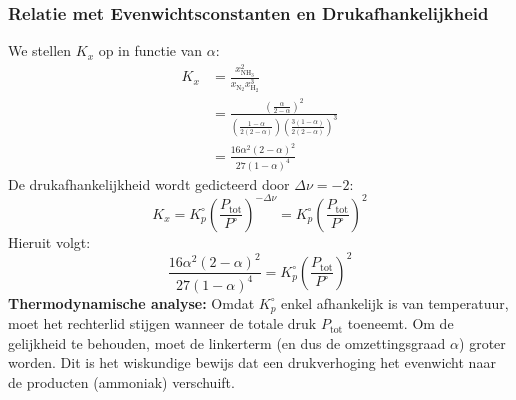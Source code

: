 \documentclass[11pt,a4paper]{article}
\begin{document}
\subsubsection{Relatie met Evenwichtsconstanten en Drukafhankelijkheid}
We stellen $K_x$ op in functie van $\alpha$:
\begin{align}
    K_x &= \frac{x_{\text{NH}_3}^2}{x_{\text{N}_2} x_{\text{H}_2}^3} \\
        &= \frac{\left( \frac{\alpha}{2-\alpha} \right)^2}{\left( \frac{1-\alpha}{2(2-\alpha)} \right) \left( \frac{3(1-\alpha)}{2(2-\alpha)} \right)^3} \\
        &= \frac{16 \alpha^2 (2-\alpha)^2}{27 (1-\alpha)^4}
\end{align}
De drukafhankelijkheid wordt gedicteerd door $\Delta \nu = -2$:
\begin{equation}
    K_x = K_p^\circ \left( \frac{P_{\text{tot}}}{P^\circ} \right)^{-\Delta \nu} = K_p^\circ \left( \frac{P_{\text{tot}}}{P^\circ} \right)^2
\end{equation}
Hieruit volgt:
\begin{equation}
    \frac{16 \alpha^2 (2-\alpha)^2}{27 (1-\alpha)^4} = K_p^\circ \left( \frac{P_{\text{tot}}}{P^\circ} \right)^2
\end{equation}
\textbf{Thermodynamische analyse:} 
Omdat $K_p^\circ$ enkel afhankelijk is van temperatuur, moet het rechterlid stijgen wanneer de totale druk $P_{\text{tot}}$ toeneemt. Om de gelijkheid te behouden, moet de linkerterm (en dus de omzettingsgraad $\alpha$) groter worden. Dit is het wiskundige bewijs dat een drukverhoging het evenwicht naar de producten (ammoniak) verschuift.
\end{document}
